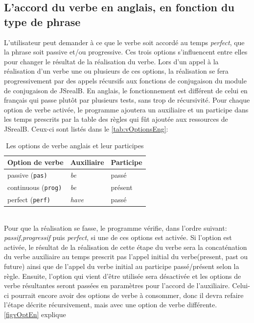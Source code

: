 \documentclass[11pt]{article} %
\newcommand{\system}[1]{\textsf{#1}}
\newcommand{\JSB}{\system{JSrealB}}
\begin{document}
\subsection{L'accord du verbe en anglais, en fonction du type de phrase}
\label{pppEn}
L'utilisateur peut demander à ce que le verbe soit accordé au temps \emph{perfect}, que la phrase soit passive et/ou progressive. Ces trois options s'influencent entre elles pour changer le
résultat de la réalisation du verbe. Lors d'un appel à la réalisation
d'un verbe une ou plusieurs de ces options, la réalisation se fera progressivement
par des appels récursifs aux fonctions de conjugaison du module de
conjugaison de \JSB{}. En anglais, le fonctionnement est différent
de celui en français qui passe plutôt par plusieurs tests, sans trop
de récursivité. Pour chaque option de verbe activée, le programme ajoutera
un auxiliaire et un participe dans les temps prescrits par la table
des règles qui fût ajoutée aux ressources de \JSB{}. Ceux-ci
sont listés dans le \autoref{tab:vOptionsEng}: 
\\
\begin{table}[ht]
\centering
\caption{Les options de verbe anglais et leur participes}
\begin{tabular}{|l|l|l|}
\hline 
Option de verbe & Auxiliaire & Participe\\
\hline 
\hline 
passive (\texttt{pas)} & \emph{be} & passé\\
\hline 
continuous (\texttt{prog)} & \emph{be} & présent\\
\hline 
perfect (\texttt{perf)} & \emph{have} & passé\\
\hline 
\end{tabular}
\label{tab:vOptionsEng}
\end{table}
\\
Pour que la réalisation se fasse, le programme vérifie, dans l'ordre
suivant: \emph{passif,progressif} puis \emph{perfect}, si une de ces options est
activée. Si l'option est activée, le résultat de la réalisation de
cette étape du verbe sera la concaténation du verbe auxiliaire au
temps prescrit pas l'appel initial du verbe(present, past ou future)
ainsi que de l'appel du verbe initial au participe passé/présent selon
la règle. Ensuite, l'option qui vient d'être utilisée sera désactivée et les options
de verbe résultantes seront passées en paramètres pour l'accord de
l'auxiliaire. Celui-ci pourrait encore avoir des options de verbe
à consommer, donc il devra refaire l'étape décrite récursivement,
mais avec une option de verbe différente. \autoref{figvOptEn} explique
\end{document}
